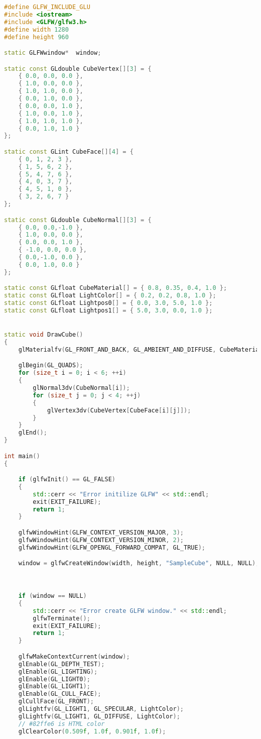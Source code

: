 \documentclass[12pt,a4paper]{jsarticle}
\begin{document}
\begin{lstlisting}[language=C++]
#define GLFW_INCLUDE_GLU
#include <iostream>
#include <GLFW/glfw3.h>
#define width 1280
#define height 960

static GLFWwindow*  window;

static const GLdouble CubeVertex[][3] = {
	{ 0.0, 0.0, 0.0 },
	{ 1.0, 0.0, 0.0 },
	{ 1.0, 1.0, 0.0 },
	{ 0.0, 1.0, 0.0 },
	{ 0.0, 0.0, 1.0 },
	{ 1.0, 0.0, 1.0 },
	{ 1.0, 1.0, 1.0 },
	{ 0.0, 1.0, 1.0 }
};

static const GLint CubeFace[][4] = {
	{ 0, 1, 2, 3 },
	{ 1, 5, 6, 2 },
	{ 5, 4, 7, 6 },
	{ 4, 0, 3, 7 },
	{ 4, 5, 1, 0 },
	{ 3, 2, 6, 7 }
};

static const GLdouble CubeNormal[][3] = {
	{ 0.0, 0.0,-1.0 },
	{ 1.0, 0.0, 0.0 },
	{ 0.0, 0.0, 1.0 },
	{ -1.0, 0.0, 0.0 },
	{ 0.0,-1.0, 0.0 },
	{ 0.0, 1.0, 0.0 }
};

static const GLfloat CubeMaterial[] = { 0.8, 0.35, 0.4, 1.0 };
static const GLfloat LightColor[] = { 0.2, 0.2, 0.8, 1.0 };
static const GLfloat Lightpos0[] = { 0.0, 3.0, 5.0, 1.0 };
static const GLfloat Lightpos1[] = { 5.0, 3.0, 0.0, 1.0 };


static void DrawCube()
{
	glMaterialfv(GL_FRONT_AND_BACK, GL_AMBIENT_AND_DIFFUSE, CubeMaterial);

	glBegin(GL_QUADS);
	for (size_t i = 0; i < 6; ++i)
	{
		glNormal3dv(CubeNormal[i]);
		for (size_t j = 0; j < 4; ++j)
		{
			glVertex3dv(CubeVertex[CubeFace[i][j]]);
		}
	}
	glEnd();
}

int main()
{

	if (glfwInit() == GL_FALSE)
	{
		std::cerr << "Error initilize GLFW" << std::endl;
		exit(EXIT_FAILURE);
		return 1;
	}

	glfwWindowHint(GLFW_CONTEXT_VERSION_MAJOR, 3);
	glfwWindowHint(GLFW_CONTEXT_VERSION_MINOR, 2);
	glfwWindowHint(GLFW_OPENGL_FORWARD_COMPAT, GL_TRUE);

	window = glfwCreateWindow(width, height, "SampleCube", NULL, NULL);



	if (window == NULL)
	{
		std::cerr << "Error create GLFW window." << std::endl;
		glfwTerminate();
		exit(EXIT_FAILURE);
		return 1;
	}

	glfwMakeContextCurrent(window);
	glEnable(GL_DEPTH_TEST);
	glEnable(GL_LIGHTING);
	glEnable(GL_LIGHT0);
	glEnable(GL_LIGHT1);
	glEnable(GL_CULL_FACE);
	glCullFace(GL_FRONT);
	glLightfv(GL_LIGHT1, GL_SPECULAR, LightColor);
	glLightfv(GL_LIGHT1, GL_DIFFUSE, LightColor);
	// #82ffe6 is HTML color
	glClearColor(0.509f, 1.0f, 0.901f, 1.0f);


\end{lstlisting}
\end{document}
